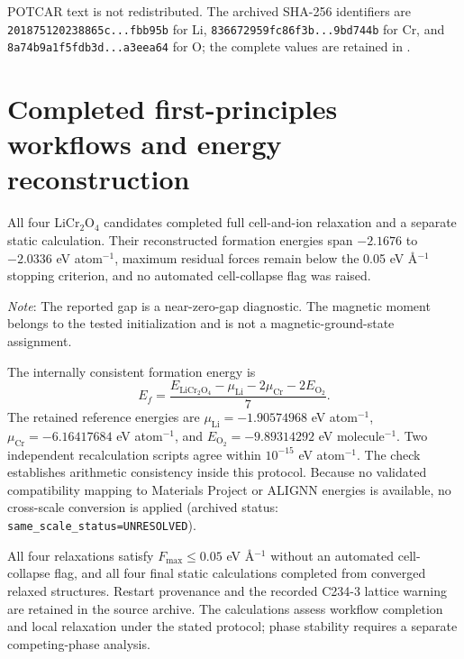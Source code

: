 \documentclass[cmc,article,submit,moreauthors,pdftex]{Definitions/tsp}
\newcommand{\tabnote}[1]{\par\smallskip\noindent\begin{minipage}{\linewidth}\footnotesize\emph{Note}: #1\end{minipage}\par}
\begin{document}
POTCAR text is not redistributed. The archived SHA-256 identifiers are
\texttt{201875120238865c...fbb95b} for Li,
\texttt{836672959fc86f3b...9bd744b} for Cr, and
\texttt{8a74b9a1f5fdb3d...a3eea64} for O; the complete values are retained in
.

\section{Completed first-principles workflows and energy reconstruction}

All four LiCr$_2$O$_4$ candidates completed full cell-and-ion relaxation and a
separate static calculation. Their reconstructed formation energies span
$-2.1676$ to $-2.0336$ eV atom$^{-1}$, maximum residual forces remain below the
0.05 eV \AA$^{-1}$ stopping criterion, and no automated cell-collapse flag was
raised.

\begin{table}[H]
\centering
\caption{Completed LiCr$_2$O$_4$ first-principles feasibility calculations.}
\label{tab:s-dft-candidates}
\tablesize{\scriptsize}
\resizebox{\textwidth}{!}{}
\tabnote{The reported gap is a near-zero-gap diagnostic. The magnetic moment
belongs to the tested initialization and is not a magnetic-ground-state
assignment.}
\end{table}

The internally consistent formation energy is
\begin{equation}
E_f =
\frac{E_{\mathrm{LiCr_2O_4}}-\mu_{\mathrm{Li}}
-2\mu_{\mathrm{Cr}}-2E_{\mathrm{O_2}}}{7}.
\end{equation}
The retained reference energies are
$\mu_{\mathrm{Li}}=-1.90574968$ eV atom$^{-1}$,
$\mu_{\mathrm{Cr}}=-6.16417684$ eV atom$^{-1}$, and
$E_{\mathrm{O_2}}=-9.89314292$ eV molecule$^{-1}$. Two independent
recalculation scripts agree within $10^{-15}$ eV atom$^{-1}$. The check
establishes arithmetic consistency inside this protocol. Because no validated
compatibility mapping to Materials Project or ALIGNN energies is available, no
cross-scale conversion is applied
(archived status: \texttt{same\_scale\_status=UNRESOLVED}).

All four relaxations satisfy $F_{\max}\leq0.05$ eV \AA$^{-1}$ without an
automated cell-collapse flag, and all four final static calculations completed
from converged relaxed structures. Restart provenance and the recorded C234-3
lattice warning are retained in the source archive. The calculations assess
workflow completion and local relaxation under the stated protocol; phase
stability requires a separate competing-phase analysis.
\end{document}
